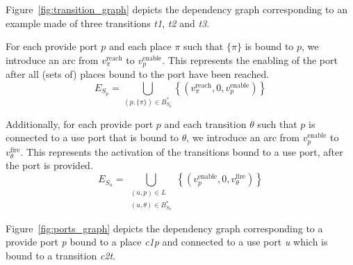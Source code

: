 Figure~\ref{fig:transition_graph} depicts the dependency graph corresponding to an example made of three transitions \emph{t1}, \emph{t2} and \emph{t3}.




For each provide port $p$ and each place $\pi$ such that
$\{\pi\}$ is bound to $p$, we introduce an arc from
$v_\pi^\text{reach}$ to $v_p^\text{enable}$. This represents the
enabling of the port after all (sets of) places bound to the port
have been reached.
\[
E_{S_p}= \bigcup_{(p,\{\pi\})\in B_{S_p}^*}\left\{ \left(v_\pi^\text{reach},0,v_p^\text{enable}\right)\right\}
\]

Additionally, for each provide port $p$ and each transition
$\theta$ such that $p$ is connected to a use port that is bound
to $\theta$, we introduce an arc from $v_p^\text{enable}$ to
$v_\theta^\text{fire}$. This represents the activation of the transitions
bound to a use port, after the port is provided.
\[
E_{S_u} = \bigcup_{\substack{(u,p)\in L \\ (u,\theta)\in B_{S_u}^*}} \left\{ \left(v_p^\text{enable},0,v_\theta^\text{fire}\right)\right\}
\]

Figure~\ref{fig:ports_graph} depicts the dependency graph corresponding to a
provide port \emph{p} bound to a place \emph{c1p} and connected to
a use port \emph{u} which is bound to a transition \emph{c2t}.


